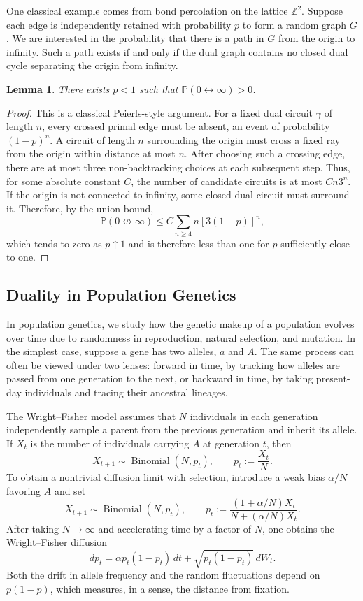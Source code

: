 \documentclass[11pt]{article}
\newtheorem{lemma}{Lemma}
\newcommand{\Pp}{\mathbb{P}}
\begin{document}
One classical example comes from bond percolation on the lattice $\mathbb Z^2$.
Suppose each edge is independently retained with probability $p$ to form a
random graph $G$. We are interested in the probability that there is a path in
$G$ from the origin to infinity. Such a path exists if and only if the dual
graph contains no closed dual cycle separating the origin from infinity.

\begin{lemma}
There exists $p<1$ such that $\Pp(0\leftrightarrow\infty)>0$.
\end{lemma}

\begin{proof}
This is a classical Peierls-style argument. For a fixed dual circuit $\gamma$
of length $n$, every crossed primal edge must be absent, an event of
probability $(1-p)^n$. A circuit of length $n$ surrounding the origin must
cross a fixed ray from the origin within distance at most $n$. After choosing
such a crossing edge, there are at most three non-backtracking choices at each
subsequent step. Thus, for some absolute constant $C$, the number of candidate
circuits is at most $Cn3^n$. If the origin is not connected to infinity, some
closed dual circuit must surround it. Therefore, by the union bound,
\[
  \Pp(0\not\leftrightarrow\infty)
  \leq C\sum_{n\geq4}n[3(1-p)]^n,
\]
which tends to zero as $p\uparrow1$ and is therefore less than one for $p$
sufficiently close to one.
\end{proof}

\subsection{Duality in Population Genetics}

In population genetics, we study how the genetic makeup of a population
evolves over time due to randomness in reproduction, natural selection, and
mutation. In the simplest case, suppose a gene has two alleles, $a$ and $A$.
The same process can often be viewed under two lenses: forward in time, by
tracking how alleles are passed from one generation to the next, or backward in
time, by taking present-day individuals and tracing their ancestral lineages.

The Wright--Fisher model assumes that $N$ individuals in each generation
independently sample a parent from the previous generation and inherit its
allele. If $X_t$ is the number of individuals carrying $A$ at generation $t$,
then
\[
  X_{t+1}\sim\operatorname{Binomial}(N,p_t),
  \qquad p_t:=\frac{X_t}{N}.
\]
To obtain a nontrivial diffusion limit with selection, introduce a weak bias
$\alpha/N$ favoring $A$ and set
\[
  X_{t+1}\sim\operatorname{Binomial}(N,p_t),
  \qquad p_t:=\frac{(1+\alpha/N)X_t}{N+(\alpha/N)X_t}.
\]
After taking $N\to\infty$ and accelerating time by a factor of $N$, one
obtains the Wright--Fisher diffusion
\[
  dp_t=\alpha p_t(1-p_t)\,dt+\sqrt{p_t(1-p_t)}\,dW_t.
\]
Both the drift in allele frequency and the random fluctuations depend on
$p(1-p)$, which measures, in a sense, the distance from fixation.
\end{document}
